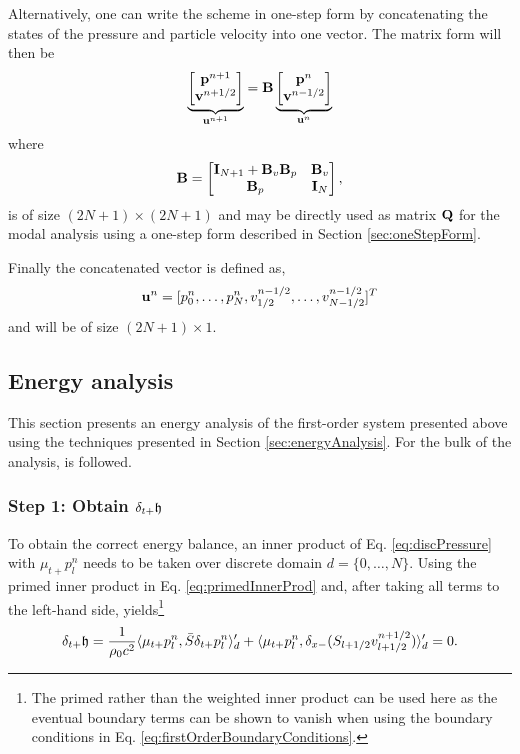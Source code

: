 {Alternatively, one can write the scheme in one-step form by concatenating the states of the pressure and particle velocity into one vector. The matrix form will then be 
\begin{equation}
    \underbrace{\begin{bmatrix}
        \mathbf{p}^{n+1}\\
        \mathbf{v}^{n+1/2}
    \end{bmatrix}}_{\mathbf{u}^{n+1}} = \mathbf{B}\underbrace{\begin{bmatrix}
        \mathbf{p}^{n}\\
        \mathbf{v}^{n-1/2}
    \end{bmatrix}}_{\mathbf{u}^{n}} 
\end{equation}
where
\begin{equation}
    \mathbf{B} = \begin{bmatrix}
        \mathbf{I}_{N+1}+\mathbf{B}_v\mathbf{B}_p & \mathbf{B}_v  \\
        \mathbf{B}_p & \mathbf{I}_{N}
    \end{bmatrix},
\end{equation}
is of size $(2N + 1) \times (2N + 1)$ and may be directly used as matrix $\mathbf{Q}$ for the modal analysis using a one-step form described in Section \ref{sec:oneStepForm}.

Finally the concatenated vector is defined as,
\begin{equation}
    \mathbf{u}^n = [p_0^n, \hdots, p_N^n, v_{1/2}^{n-1/2}, \hdots, v_{N-1/2}^{n-1/2}]^T
\end{equation}
and will be of size $(2N + 1) \times 1$. 

\subsection{Energy analysis}
This section presents an energy analysis of the first-order system presented above using the techniques presented in Section \ref{sec:energyAnalysis}. For the bulk of the analysis, \cite{Harrison2018} is followed. 

\subsubsection{Step 1: Obtain $\delta_{t+} \mathfrak{h}$}
To obtain the correct energy balance, an inner product of Eq. \eqref{eq:discPressure} with $\mu_{t+}p_l^n$ needs to be taken over discrete domain $d = \{0, \hdots, N\}$. Using the primed inner product in Eq. \eqref{eq:primedInnerProd} and, after taking all terms to the left-hand side, yields\footnote{The primed rather than the weighted inner product can be used here as the eventual boundary terms can be shown to vanish when using the boundary conditions in Eq. \eqref{eq:firstOrderBoundaryConditions}.}
\begin{equation}\label{eq:firstOrderPrimed}
    \delta_{t+}\mathfrak{h} = \frac{1}{\rho_0 c^2}\langle \mu_{t+}p_l^n, \bar{S} \delta_{t+}p_l^n \rangle_{d}' +\langle \mu_{t+}p_l^n, \delta_{x-}(S_{l+1/2}v_{l+1/2}^{n+1/2})\rangle_{d}' = 0.
\end{equation}

}
